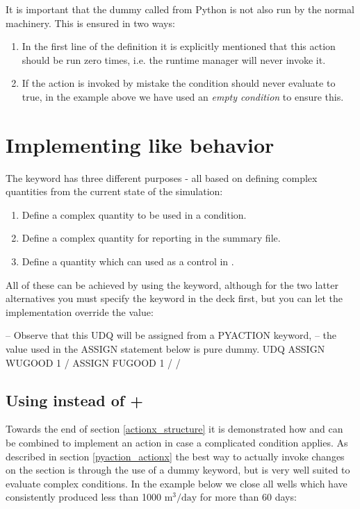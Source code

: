 It is important that the dummy \actionx{} called from Python is not also run by
the normal \actionx{} machinery. This is ensured in two ways:
\begin{enumerate}
  \item In the first line of the \actionx{} definition it is explicitly
    mentioned that this action should be run zero times, i.e. the runtime
    manager will never invoke it.
  \item If the  action is invoked by mistake the condition should
    never evaluate to true, in the example above we have used an \emph{empty
    condition} to ensure this.
\end{enumerate}
   

\section{Implementing \udq{} like behavior}
The \udq{} keyword has three different purposes - all based on defining 
complex quantities from the current state of the simulation:

\begin{enumerate}
\item Define a complex quantity to be used in a \actionx{} condition.
\item Define a complex quantity for reporting in the summary file.
\item Define a quantity which can used as a control in .
\end{enumerate}

All of these can be achieved by using the \pyaction{} keyword, although for the
two latter alternatives you must specify the \udq{} keyword in the deck first,
but you can let the \pyaction{} implementation override the value:
\begin{deck}
-- Observe that this UDQ will be assigned from a PYACTION keyword,
-- the value used in the ASSIGN statement below is pure dummy.
UDQ
  ASSIGN WUGOOD 1 /
  ASSIGN FUGOOD 1 /
/
\end{deck}

\subsection{Using \pyaction{} instead of \udq{} + \actionx{}}
Towards the end of section \ref{actionx_structure} it is demonstrated how \udq{}
and \actionx{} can be combined to implement an action in case a complicated
condition applies. As described in section \ref{pyaction_actionx} the best way
to actually invoke changes on the  section is through the use of a
dummy \actionx{} keyword, but \pyaction{} is very well suited to evaluate
complex conditions. In the example below we close all wells which have
consistently produced less than 1000 $\mathrm{m^3/day}$ for more than 60 days:

